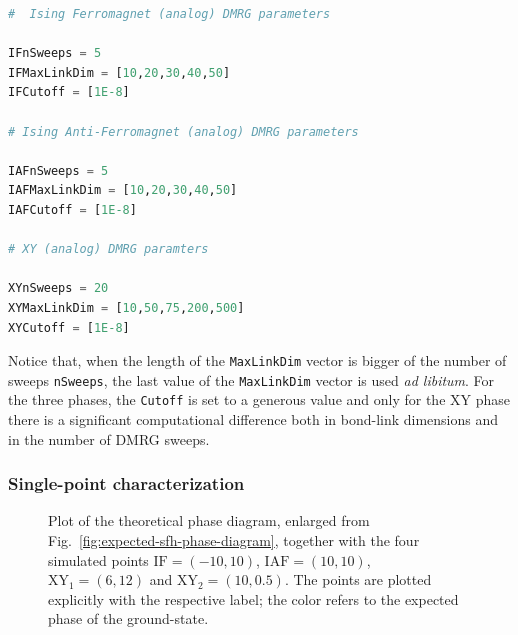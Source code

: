 \begin{lstlisting}[language=julia]
#  Ising Ferromagnet (analog) DMRG parameters

IFnSweeps = 5
IFMaxLinkDim = [10,20,30,40,50]
IFCutoff = [1E-8]

# Ising Anti-Ferromagnet (analog) DMRG parameters

IAFnSweeps = 5
IAFMaxLinkDim = [10,20,30,40,50]
IAFCutoff = [1E-8]

# XY (analog) DMRG paramters

XYnSweeps = 20
XYMaxLinkDim = [10,50,75,200,500]
XYCutoff = [1E-8]
\end{lstlisting}

\noindent Notice that, when the length of the \texttt{MaxLinkDim} vector is bigger of the number of sweeps \texttt{nSweeps}, the last value of the \texttt{MaxLinkDim} vector is used \textit{ad libitum}. For the three phases, the \texttt{Cutoff} is set to a generous value and only for the $\mathrm{XY}$ phase there is a significant computational difference both in bond-link dimensions and in the number of DMRG sweeps. 

\subsubsection{Single-point characterization}\label{subsubsec:single-point-characterization}

\begin{figure}
	\centering
	
	\caption{Plot of the theoretical phase diagram, enlarged from Fig.~\ref{fig:expected-sfh-phase-diagram}, together with the four simulated points $\mathrm{IF}=(-10,10)$, $\mathrm{IAF}=(10,10)$, $\mathrm{XY}_1=(6,12)$ and $\mathrm{XY}_2=(10,0.5)$. The points are plotted explicitly with the respective label; the color refers to the expected phase of the ground-state.}
	\label{fig:points-expected-sfh-phase-diagram.tex}
\end{figure}

